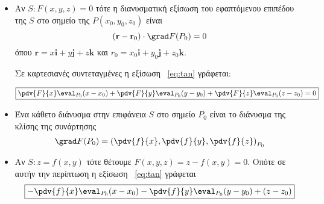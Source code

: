 




\everymath{\displaystyle}




\begin{center}
\end{center}

\vspace{\baselineskip}

\begin{itemize}
  \item Αν $S: F(x,y,z)=0$ τότε η διανυσματική εξίσωση του εφαπτόμενου επιπέδου της $S$ στο σημείο
    της $ P(x_{0}, y_{0}, z_{0}) $ είναι
    \begin{equation}\label{eq:tan}
      (\mathbf{r} - \mathbf{r}_{0})\cdot \grad F(P_{0})=0 
    \end{equation} 
    όπου $ \mathbf{r}=x \mathbf{i}+y \mathbf{j}+z \mathbf{k} $ και $ r_{0}=x_{0} \mathbf{i}+ y
    _{0} \mathbf{j}+ z_{0} \mathbf{k} $.

    Σε καρτεσιανές συντεταγμένες η εξίσωση ~\eqref{eq:tan} γράφεται:

    \[
      \boxed{		
        \pdv{F}{x}\eval_{P_{0}} (x-x_{0}) + \pdv{F}{y}\eval_{P_{0}} (y-y_{0}) +
        \pdv{F}{z}\eval_{P_{0}} (z-z_{0}) =0 
      }
    \]
  \item Ένα κάθετο διάνυσμα στην επιφάνεια $ S $ στο σημείο $ P_{0} $ είναι το διάνυσμα της κλίσης της
    συνάρτησης 
    \[
      \grad F{(P_{0})} = \left(\pdv{f}{x}, \pdv{f}{y}, \pdv{f}{z}\right)_{P_{0}}
    \] 

  \item Αν $ S: z=f(x,y) $ τότε θέτουμε $ F(x,y,z) = z - f(x,y) = 0 $. Οπότε σε
    αυτήν την περίπτωση η εξίσωση ~\eqref{eq:tan} γράφεται
    \[
      \boxed{
        -\pdv{f}{x}\eval_{P_{0}} (x - x_{0}) - \pdv{f}{y}\eval_{P_{0}} (y - y_{0}) + (z - z_{0})
      }
    \] 
\end{itemize}


